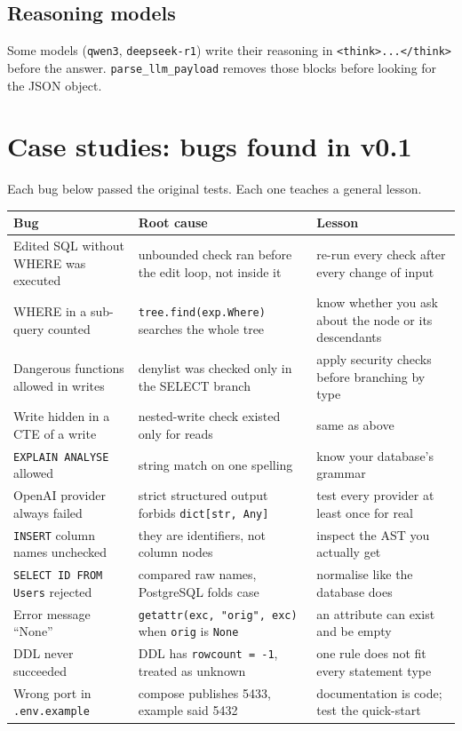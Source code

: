 \documentclass[11pt,a4paper]{article}
\begin{document}
\subsection*{Reasoning models}
Some models (\texttt{qwen3}, \texttt{deepseek-r1}) write their reasoning in
\texttt{<think>...</think>} before the answer. \texttt{parse\_llm\_payload}
removes those blocks before looking for the JSON object.

\section{Case studies: bugs found in v0.1}
\label{sec:cases}

Each bug below passed the original tests. Each one teaches a general lesson.

\begin{center}
\begin{tabular}{@{}p{4.3cm}p{5.2cm}p{5.1cm}@{}}
\toprule
\textbf{Bug} & \textbf{Root cause} & \textbf{Lesson} \\
\midrule
Edited SQL without WHERE was executed &
unbounded check ran before the edit loop, not inside it &
re-run every check after every change of input \\
\addlinespace
WHERE in a sub-query counted &
\texttt{tree.find(exp.Where)} searches the whole tree &
know whether you ask about the node or its descendants \\
\addlinespace
Dangerous functions allowed in writes &
denylist was checked only in the SELECT branch &
apply security checks before branching by type \\
\addlinespace
Write hidden in a CTE of a write &
nested-write check existed only for reads &
same as above \\
\addlinespace
\texttt{EXPLAIN ANALYSE} allowed &
string match on one spelling &
know your database's grammar \\
\addlinespace
OpenAI provider always failed &
strict structured output forbids \texttt{dict[str, Any]} &
test every provider at least once for real \\
\addlinespace
\texttt{INSERT} column names unchecked &
they are identifiers, not column nodes &
inspect the AST you actually get \\
\addlinespace
\texttt{SELECT ID FROM Users} rejected &
compared raw names, PostgreSQL folds case &
normalise like the database does \\
\addlinespace
Error message ``None'' &
\texttt{getattr(exc, "orig", exc)} when \texttt{orig} is \texttt{None} &
an attribute can exist and be empty \\
\addlinespace
DDL never succeeded &
DDL has \texttt{rowcount = -1}, treated as unknown &
one rule does not fit every statement type \\
\addlinespace
Wrong port in \texttt{.env.example} &
compose publishes 5433, example said 5432 &
documentation is code; test the quick-start \\
\bottomrule
\end{tabular}
\end{center}
\end{document}
